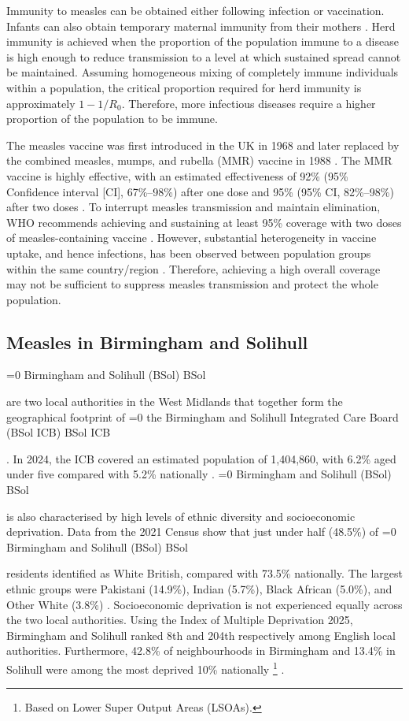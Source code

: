 \documentclass[12pt]{article}
\newcounter{bsol}
\newcommand{\bsol}{%
    \ifnum\value{bsol}=0
        \stepcounter{bsol}%
        Birmingham and Solihull (BSol)%
        \else
        BSol%
    \fi%
    \xspace
}
\newcounter{ukhsa}
\newcounter{bsolicb}
\newcommand{\bsolicb}{%
    \ifnum\value{bsolicb}=0
        \stepcounter{bsolicb}%
        the Birmingham and Solihull Integrated Care Board (BSol ICB)%
    \else
        BSol ICB%
    \fi%
    \xspace
}
\newcounter{who}
\begin{document}
Immunity to measles can be obtained either following infection or vaccination. Infants can also obtain temporary maternal immunity from their mothers \cite{TILEY2025106531}. Herd immunity is achieved when the proportion of the population immune to a disease is high enough to reduce transmission to a level at which sustained spread cannot be maintained. Assuming homogeneous mixing of completely immune individuals within a population, the critical proportion required for herd immunity is approximately $1 - 1/R_0$. Therefore, more infectious diseases require a higher proportion of the population to be immune. 

The measles vaccine was first introduced in the UK in 1968 and later replaced by the combined measles, mumps, and rubella (MMR) vaccine in 1988 \cite{ukhsa_vaccination_timeline_1796_present}. The MMR vaccine is highly effective, with an estimated effectiveness of 92\% (95\% Confidence interval [CI], 67\%–98\%) after one dose and 95\% (95\% CI, 82\%–98\%) after two doses \cite{UKHSA2026MeaslesGuidelines, 10.1086/498902}. To interrupt measles transmission and maintain elimination, WHO recommends achieving and sustaining at least 95\% coverage with two doses of measles-containing vaccine  \cite{who_measles_position_2017}. However, substantial heterogeneity in vaccine uptake, and hence infections, has been observed between population groups within the same country/region \cite{who_subnational_immunization_coverage}. Therefore, achieving a high overall coverage may not be sufficient to suppress measles transmission and protect the whole population. 


\subsection{Measles in Birmingham and Solihull}

\bsol are two local authorities in the West Midlands that together form the geographical footprint of \bsolicb. In 2024, the ICB covered an estimated population of 1,404,860, with 6.2\% aged under five compared with 5.2\% nationally \cite{ons_health_geographies_population_2025}. \bsol is also characterised by high levels of ethnic diversity and socioeconomic deprivation. Data from the 2021 Census show that just under half (48.5\%) of \bsol residents identified as White British, compared with 73.5\% nationally. The largest ethnic groups were Pakistani (14.9\%), Indian (5.7\%), Black African (5.0\%), and Other White (3.8\%) \cite{ONS2021census}. Socioeconomic deprivation is not experienced equally across the two local authorities. Using the Index of Multiple Deprivation 2025, Birmingham and Solihull ranked 8th and 204th respectively among English local authorities. Furthermore, 42.8\% of neighbourhoods in Birmingham and 13.4\% in Solihull were among the most deprived 10\% nationally \footnote{Based on Lower Super Output Areas (LSOAs).} \cite{birmingham_iod_2025, imd2025}.
\end{document}
